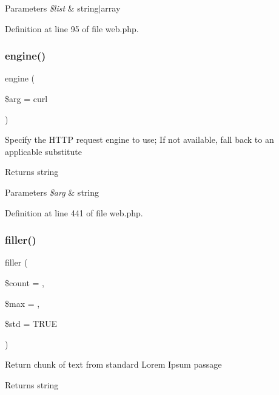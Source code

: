 \begin{DoxyParams}{Parameters}
{\em \$list} & string$\vert$array \\
\hline
\end{DoxyParams}


Definition at line 95 of file web.\+php.

\hypertarget{class_web_acf129dacf0ba4cb911f6573f8e24db54}{}\label{class_web_acf129dacf0ba4cb911f6573f8e24db54} 
\subsubsection{\texorpdfstring{engine()}{engine()}}
{\footnotesize\ttfamily engine (\begin{DoxyParamCaption}\item[{}]{\$arg = {\ttfamily \textquotesingle{}curl\textquotesingle{}} }\end{DoxyParamCaption})}

Specify the H\+T\+TP request engine to use; If not available, fall back to an applicable substitute \begin{DoxyReturn}{Returns}
string 
\end{DoxyReturn}

\begin{DoxyParams}{Parameters}
{\em \$arg} & string \\
\hline
\end{DoxyParams}


Definition at line 441 of file web.\+php.

\hypertarget{class_web_a0440b1db902b2ad8390cd1873c5aef76}{}\label{class_web_a0440b1db902b2ad8390cd1873c5aef76} 
\subsubsection{\texorpdfstring{filler()}{filler()}}
{\footnotesize\ttfamily filler (\begin{DoxyParamCaption}\item[{}]{\$count = {},  }\item[{}]{\$max = {},  }\item[{}]{\$std = {\ttfamily TRUE} }\end{DoxyParamCaption})}

Return chunk of text from standard Lorem Ipsum passage \begin{DoxyReturn}{Returns}
string 
\end{DoxyReturn}

